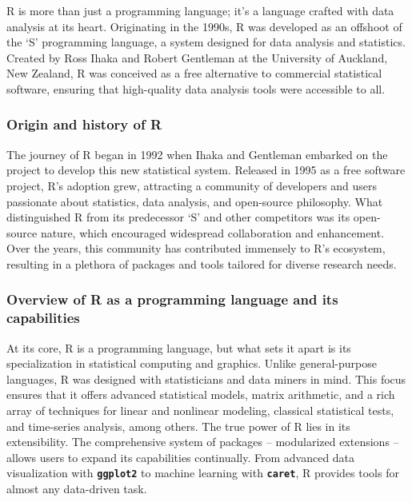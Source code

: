 \documentclass[
  b5paper]{book}
\begin{document}
R is more than just a programming language; it's a language crafted with data analysis at its heart. Originating in the 1990s, R was developed as an offshoot of the `S' programming language, a system designed for data analysis and statistics. Created by Ross Ihaka and Robert Gentleman at the University of Auckland, New Zealand, R was conceived as a free alternative to commercial statistical software, ensuring that high-quality data analysis tools were accessible to all.

\hypertarget{origin-and-history-of-r}{%
\subsubsection*{Origin and history of R}\label{origin-and-history-of-r}}

The journey of R began in 1992 when Ihaka and Gentleman embarked on the project to develop this new statistical system. Released in 1995 as a free software project, R's adoption grew, attracting a community of developers and users passionate about statistics, data analysis, and open-source philosophy. What distinguished R from its predecessor `S' and other competitors was its open-source nature, which encouraged widespread collaboration and enhancement. Over the years, this community has contributed immensely to R's ecosystem, resulting in a plethora of packages and tools tailored for diverse research needs.

\hypertarget{overview-of-r-as-a-programming-language-and-its-capabilities}{%
\subsubsection*{Overview of R as a programming language and its capabilities}\label{overview-of-r-as-a-programming-language-and-its-capabilities}}

At its core, R is a programming language, but what sets it apart is its specialization in statistical computing and graphics. Unlike general-purpose languages, R was designed with statisticians and data miners in mind. This focus ensures that it offers advanced statistical models, matrix arithmetic, and a rich array of techniques for linear and nonlinear modeling, classical statistical tests, and time-series analysis, among others. The true power of R lies in its extensibility. The comprehensive system of packages -- modularized extensions -- allows users to expand its capabilities continually. From advanced data visualization with \textbf{\texttt{ggplot2}} to machine learning with \textbf{\texttt{caret}}, R provides tools for almost any data-driven task.
\end{document}
